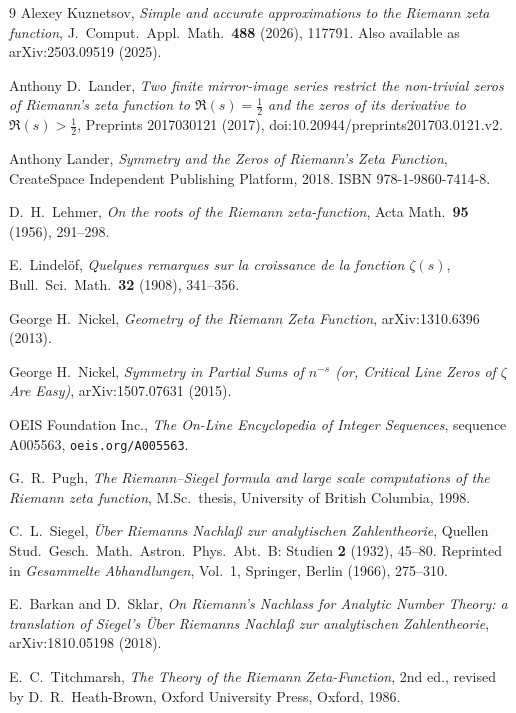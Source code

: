 \documentclass[11pt]{article}
\theoremstyle{definition}
\begin{document}
\begin{thebibliography}{9}
Alexey Kuznetsov, \emph{Simple and accurate approximations to the Riemann
zeta function}, J.\ Comput.\ Appl.\ Math.\ \textbf{488} (2026), 117791.
Also available as arXiv:2503.09519 (2025).

Anthony D.\ Lander, \emph{Two finite mirror-image series restrict the
non-trivial zeros of Riemann's zeta function to $\Re(s)=\tfrac12$ and the zeros
of its derivative to $\Re(s)>\tfrac12$}, Preprints 2017030121 (2017),
doi:10.20944/preprints201703.0121.v2.

Anthony Lander, \emph{Symmetry and the Zeros of Riemann's Zeta Function},
CreateSpace Independent Publishing Platform, 2018.
ISBN 978-1-9860-7414-8.

D.~H.\ Lehmer, \emph{On the roots of the Riemann zeta-function},
Acta Math.\ \textbf{95} (1956), 291--298.

E.~Lindel\"of, \emph{Quelques remarques sur la croissance de la fonction
$\zeta(s)$}, Bull.\ Sci.\ Math.\ \textbf{32} (1908), 341--356.

George H.\ Nickel, \emph{Geometry of the Riemann Zeta Function},
arXiv:1310.6396 (2013).

George H.\ Nickel, \emph{Symmetry in Partial Sums of $n^{-s}$ (or, Critical Line
Zeros of $\zeta$ Are Easy)}, arXiv:1507.07631 (2015).

OEIS Foundation Inc., \emph{The On-Line Encyclopedia of Integer Sequences},
sequence A005563, \texttt{oeis.org/A005563}.

G.~R.\ Pugh, \emph{The Riemann--Siegel formula and large scale computations
of the Riemann zeta function}, M.Sc.\ thesis, University of British
Columbia, 1998.

C.~L.\ Siegel, \emph{\"Uber Riemanns Nachla\ss{} zur analytischen
Zahlentheorie}, Quellen Stud.\ Gesch.\ Math.\ Astron.\ Phys.\ Abt.\ B:
Studien \textbf{2} (1932), 45--80. Reprinted in \emph{Gesammelte
Abhandlungen}, Vol.~1, Springer, Berlin (1966), 275--310.

E.~Barkan and D.~Sklar, \emph{On Riemann's Nachlass for Analytic Number
Theory: a translation of Siegel's \"Uber Riemanns Nachla\ss{} zur
analytischen Zahlentheorie}, arXiv:1810.05198 (2018).

E.~C.\ Titchmarsh, \emph{The Theory of the Riemann Zeta-Function}, 2nd ed.,
revised by D.~R.\ Heath-Brown, Oxford University Press, Oxford, 1986.

\end{thebibliography}
\end{document}
